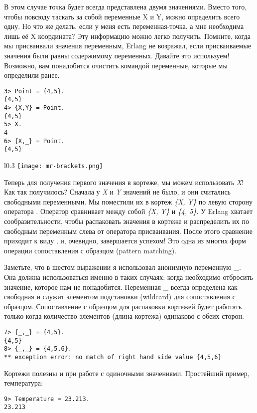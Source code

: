 В этом случае точка будет всегда представлена двумя значениями.
Вместо того, чтобы повсюду таскать за собой переменные X и Y, можно определить всего одну.
Но что же делать, если у меня есть переменная\--точка, а мне необходима лишь её X координата?
Эту информацию можно легко получить.
Помните, когда мы присваивали значения переменным, Erlang не возражал, если присваиваемые значения были равны содержимому переменных.
Давайте это используем!
Возможно, вам понадобится очистить командой  переменные, которые мы определили ранее.
\begin{lstlisting}[style=repl]
3> Point = {4,5}.
{4,5}
4> {X,Y} = Point.
{4,5}
5> X.
4
6> {X,_} = Point.
{4,5}
\end{lstlisting}
\begin{wrapfigure}{l}{0.3\textwidth}
    \texttt{[image: mr-brackets.png]}
\end{wrapfigure}

Теперь для получения первого значения в кортеже, мы можем использовать \emph{X}!
Как так получилось?
Сначала у \emph{X} и \emph{Y} значений не было, и они считались свободными переменными.
Мы поместили их в кортеж \emph{\{X, Y\}} по левую сторону оператора \ops{=}.
Оператор \ops{=} сравнивает между собой \emph{\{X, Y\}} и \emph{\{4, 5\}}.
У Erlang хватает сообразительности, чтобы распаковать значения в кортеже и распределить их по свободным переменным слева от оператора присваивания.
После этого сравнение приходит к виду , и, очевидно, завершается успехом!
Это одна из многих форм операции сопоставления с образцом (pattern matching).

Заметьте, что в шестом выражении я использовал анонимную переменную \_.
Она должна использоваться именно в таких случаях: когда необходимо отбросить значение, которое нам не понадобится.
Переменная \_ всегда определена как свободная и служит элементом подстановки (wildcard) для сопоставления с образцом.
Сопоставление с образцом для распаковки кортежей будет работать только когда количество элементов (длина кортежа) одинаково с обеих сторон.
\begin{lstlisting}[style=repl]
7> {_,_} = {4,5}.
{4,5}
8> {_,_} = {4,5,6}.
** exception error: no match of right hand side value {4,5,6}
\end{lstlisting}

Кортежи полезны и при работе с одиночными значениями.
Простейший пример, температура:
\begin{lstlisting}[style=repl]
9> Temperature = 23.213.
23.213
\end{lstlisting}

